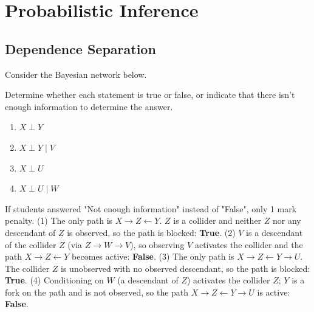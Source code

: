 \section{\points[16] Probabilistic Inference}
\subsection{\points[8] Dependence Separation}
Consider the Bayesian network below.
\begin{figure}[H]
\centering
{}
\end{figure}
\noindent
Determine whether each statement is true or false, or indicate that there isn't enough information to determine the answer.
\begin{enumerate}
\item \points[2] $X \perp Y$ \\[5mm]
\choicecorrect[True]\choice[False]
\item \points[2] $X \perp Y \mid V$ \\[5mm]
\choice[True]\choicecorrect[False]
\item \points[2] $X \perp U$\\[5mm]
\choicecorrect[True]\choice[False]
\item \points[2] $X \perp U \mid W$\\[5mm]
\choice[True]\choicecorrect[False]
\end{enumerate}
\begin{solution}
If students answered "Not enough information" instead of "False", only 1 mark penalty.
\medskip
\noindent (1) The only path is $X \to Z \leftarrow Y$. $Z$ is a collider and neither $Z$ nor any
descendant of $Z$ is observed, so the path is blocked: \textbf{True}.
\noindent (2) $V$ is a descendant of the collider $Z$ (via $Z\to W\to V$), so observing $V$
activates the collider and the path $X \to Z \leftarrow Y$ becomes active: \textbf{False}.
\noindent (3) The only path is $X \to Z \leftarrow Y \to U$. The collider $Z$ is unobserved
with no observed descendant, so the path is blocked: \textbf{True}.
\noindent (4) Conditioning on $W$ (a descendant of $Z$) activates the collider $Z$; $Y$ is a
fork on the path and is not observed, so the path $X \to Z \leftarrow Y \to U$ is active:
\textbf{False}.
\end{solution}
\clearpage
